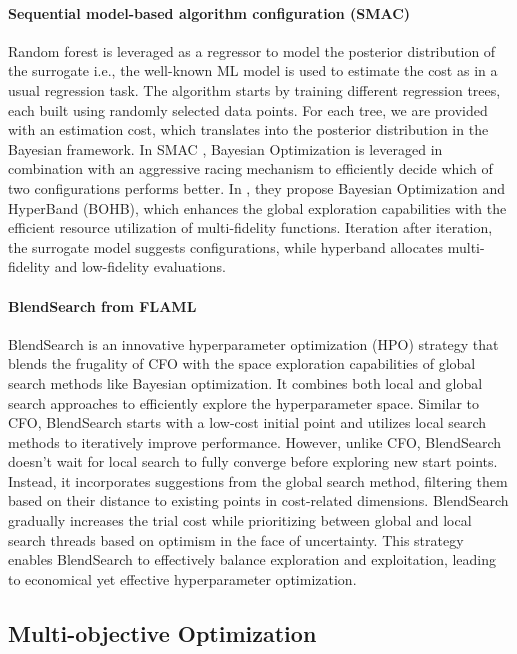 \paragraph{Sequential model-based algorithm configuration (SMAC)} Random forest \cite{20} is leveraged as a regressor to model the posterior distribution of the surrogate i.e., the well-known ML model is used to estimate the cost as in a usual regression task.
The algorithm starts by training different regression trees, each built using randomly selected data points.
For each tree, we are provided with an estimation cost, which translates into the posterior distribution in the Bayesian framework.
In SMAC \cite{smac}, Bayesian Optimization is leveraged in combination with an aggressive racing mechanism to efficiently decide which of two configurations performs better.
In \cite{falkner2018bohb}, they propose Bayesian Optimization and HyperBand (BOHB), which enhances the global exploration capabilities with the efficient resource utilization of multi-fidelity functions.
Iteration after iteration, the surrogate model suggests configurations, while hyperband allocates multi-fidelity and low-fidelity evaluations.


\paragraph{BlendSearch from FLAML}
BlendSearch is an innovative hyperparameter optimization (HPO) strategy that blends the frugality of CFO with the space exploration capabilities of global search methods like Bayesian optimization. It combines both local and global search approaches to efficiently explore the hyperparameter space. Similar to CFO, BlendSearch starts with a low-cost initial point and utilizes local search methods to iteratively improve performance. However, unlike CFO, BlendSearch doesn't wait for local search to fully converge before exploring new start points. Instead, it incorporates suggestions from the global search method, filtering them based on their distance to existing points in cost-related dimensions. BlendSearch gradually increases the trial cost while prioritizing between global and local search threads based on optimism in the face of uncertainty. This strategy enables BlendSearch to effectively balance exploration and exploitation, leading to economical yet effective hyperparameter optimization.


\subsection{Multi-objective Optimization}


